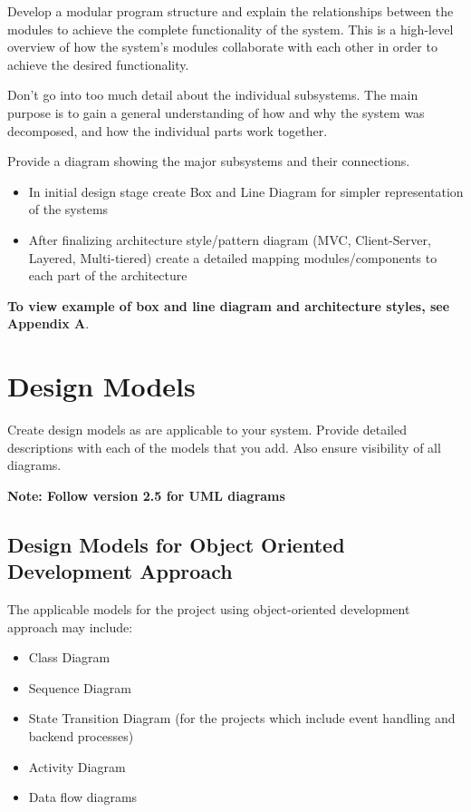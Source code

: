 \documentclass[12pt,a4paper]{report}
\begin{document}
Develop a modular program structure and explain the relationships between the modules to achieve the complete functionality of the system. This is a high-level overview of how the system's modules collaborate with each other in order to achieve the desired functionality.

Don't go into too much detail about the individual subsystems. The main purpose is to gain a general understanding of how and why the system was decomposed, and how the individual parts work together.

Provide a diagram showing the major subsystems and their connections.

\begin{itemize}
    \item In initial design stage create Box and Line Diagram for simpler representation of the systems
    \item After finalizing architecture style/pattern diagram (MVC, Client-Server, Layered, Multi-tiered) create a detailed mapping modules/components to each part of the architecture
\end{itemize}

\textbf{To view example of box and line diagram and architecture styles, see Appendix A}.

\chapter{Design Models}

Create design models as are applicable to your system. Provide detailed descriptions with each of the models that you add. Also ensure visibility of all diagrams.

\textbf{Note: Follow version 2.5 for UML diagrams}

\section*{Design Models for Object Oriented Development Approach}

The applicable models for the project using object-oriented development approach may include:

\begin{itemize}
    \item Class Diagram
    \item Sequence Diagram
    \item State Transition Diagram (for the projects which include event handling and backend processes)
    \item Activity Diagram
    \item Data flow diagrams
\end{itemize}
\end{document}
